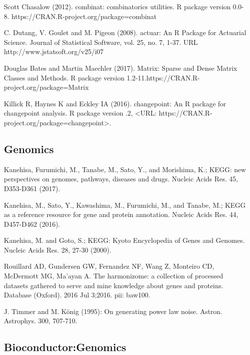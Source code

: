 \documentclass[preprint, 8pt]{elsarticle}
\theoremstyle{definition}
\begin{document}
\begin{thebibliography}{00}
 Scott Chasalow (2012). 
\newblock combinat: combinatorics utilities. 
\newblock R package version 0.0-8. https://CRAN.R-project.org/package=combinat

 C. Dutang, V. Goulet and M. Pigeon (2008). 
\newblock actuar: An R Package for Actuarial Science. 
\newblock Journal of Statistical Software, vol. 25, no. 7, 1-37. URL http://www.jstatsoft.org/v25/i07

 Douglas Bates and Martin Maechler (2017). 
\newblock Matrix: Sparse and Dense Matrix Classes and Methods. 
\newblock R package version 1.2-11.https://CRAN.R-project.org/package=Matrix

 Killick R, Haynes K and Eckley IA (2016).
\newblock changepoint: An R package for changepoint analysis. R package version
.2, <URL: https://CRAN.R-project.org/package=changepoint>.

\subsection{Genomics}

 Kanehisa, Furumichi, M., Tanabe, M., Sato, Y., and Morishima, K.; 
\newblock KEGG: new perspectives on genomes, pathways, diseases and drugs. 
\newblock Nucleic Acids Res. 45, D353-D361 (2017).

 Kanehisa, M., Sato, Y., Kawashima, M., Furumichi, M., and Tanabe, M.; 
\newblock KEGG as a reference resource for gene and protein annotation. 
\newblock Nucleic Acids Res. 44, D457-D462 (2016).

 Kanehisa, M. and Goto, S.; 
\newblock KEGG: Kyoto Encyclopedia of Genes and Genomes. 
\newblock Nucleic Acids Res. 28, 27-30 (2000). 

 Rouillard AD, Gundersen GW, Fernandez NF, Wang Z, Monteiro CD, McDermott MG, Ma'ayan A. 
\newblock The harmonizome: a collection of processed datasets gathered to serve and mine knowledge about genes and proteins. 
\newblock Database (Oxford). 2016 Jul 3;2016. pii: baw100. 

 J. Timmer and M. König (1995): 
\newblock On generating power law noise. 
\newblock Astron. Astrophys. 300, 707-710.

\subsection{Bioconductor:Genomics}


\end{thebibliography}
\end{document}
